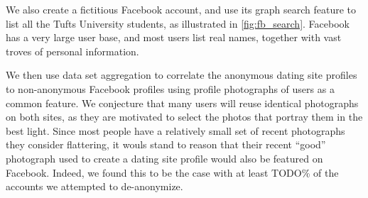 We also create a fictitious Facebook\cite{fb2014} account, and use its graph search feature to list all the Tufts University students, as illustrated in \ref{fig:fb_search}. Facebook has a very large user base, and most users list real names, together with vast troves of personal information.

We then use data set aggregation to correlate the anonymous dating site profiles to non-anonymous Facebook profiles using profile photographs of users as a common feature.
We conjecture that many users will reuse identical photographs on both sites, as they are motivated to select the photos that portray them in the best light.
Since most people have a relatively small set of recent photographs they consider flattering, it wouls stand to reason that their recent ``good'' photograph used to create a dating site profile would also be featured on Facebook.
Indeed, we found this to be the case with at least TODO\% of the accounts we attempted to de-anonymize.
